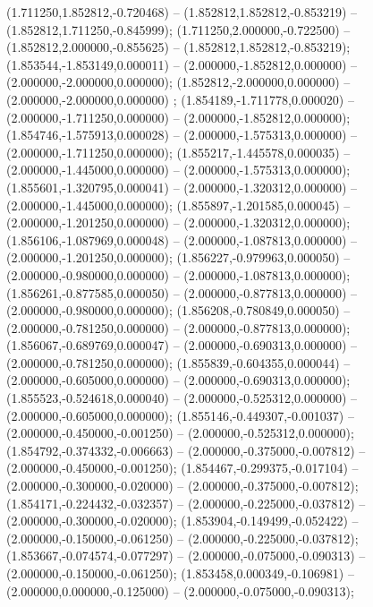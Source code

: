  (1.711250,1.852812,-0.720468) -- (1.852812,1.852812,-0.853219) -- (1.852812,1.711250,-0.845999);
 (1.711250,2.000000,-0.722500) -- (1.852812,2.000000,-0.855625) -- (1.852812,1.852812,-0.853219);
 (1.853544,-1.853149,0.000011) -- (2.000000,-1.852812,0.000000) -- (2.000000,-2.000000,0.000000);
 (1.852812,-2.000000,0.000000) -- (2.000000,-2.000000,0.000000) ;
 (1.854189,-1.711778,0.000020) -- (2.000000,-1.711250,0.000000) -- (2.000000,-1.852812,0.000000);
 (1.854746,-1.575913,0.000028) -- (2.000000,-1.575313,0.000000) -- (2.000000,-1.711250,0.000000);
 (1.855217,-1.445578,0.000035) -- (2.000000,-1.445000,0.000000) -- (2.000000,-1.575313,0.000000);
 (1.855601,-1.320795,0.000041) -- (2.000000,-1.320312,0.000000) -- (2.000000,-1.445000,0.000000);
 (1.855897,-1.201585,0.000045) -- (2.000000,-1.201250,0.000000) -- (2.000000,-1.320312,0.000000);
 (1.856106,-1.087969,0.000048) -- (2.000000,-1.087813,0.000000) -- (2.000000,-1.201250,0.000000);
 (1.856227,-0.979963,0.000050) -- (2.000000,-0.980000,0.000000) -- (2.000000,-1.087813,0.000000);
 (1.856261,-0.877585,0.000050) -- (2.000000,-0.877813,0.000000) -- (2.000000,-0.980000,0.000000);
 (1.856208,-0.780849,0.000050) -- (2.000000,-0.781250,0.000000) -- (2.000000,-0.877813,0.000000);
 (1.856067,-0.689769,0.000047) -- (2.000000,-0.690313,0.000000) -- (2.000000,-0.781250,0.000000);
 (1.855839,-0.604355,0.000044) -- (2.000000,-0.605000,0.000000) -- (2.000000,-0.690313,0.000000);
 (1.855523,-0.524618,0.000040) -- (2.000000,-0.525312,0.000000) -- (2.000000,-0.605000,0.000000);
 (1.855146,-0.449307,-0.001037) -- (2.000000,-0.450000,-0.001250) -- (2.000000,-0.525312,0.000000);
 (1.854792,-0.374332,-0.006663) -- (2.000000,-0.375000,-0.007812) -- (2.000000,-0.450000,-0.001250);
 (1.854467,-0.299375,-0.017104) -- (2.000000,-0.300000,-0.020000) -- (2.000000,-0.375000,-0.007812);
 (1.854171,-0.224432,-0.032357) -- (2.000000,-0.225000,-0.037812) -- (2.000000,-0.300000,-0.020000);
 (1.853904,-0.149499,-0.052422) -- (2.000000,-0.150000,-0.061250) -- (2.000000,-0.225000,-0.037812);
 (1.853667,-0.074574,-0.077297) -- (2.000000,-0.075000,-0.090313) -- (2.000000,-0.150000,-0.061250);
 (1.853458,0.000349,-0.106981) -- (2.000000,0.000000,-0.125000) -- (2.000000,-0.075000,-0.090313);
